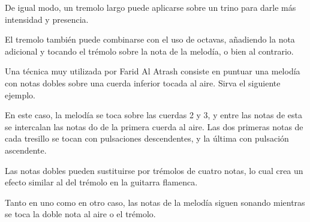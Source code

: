 De igual modo, un tremolo largo puede aplicarse sobre un trino para darle más intensidad y presencia.

El tremolo también puede combinarse con el uso de octavas, añadiendo la nota adicional y tocando el trémolo sobre la nota de la melodía, o bien al contrario.

Una técnica muy utilizada por Farid Al Atrash consiste en puntuar una melodía con notas dobles sobre una cuerda inferior tocada al aire. Sirva el siguiente ejemplo.


\begin{center}
\end{center}



En este caso, la melodía se toca sobre las cuerdas 2 y 3, y entre las notas de esta se intercalan las notas do de la primera cuerda al aire. Las dos primeras notas de cada tresillo se tocan con pulsaciones descendentes, y la última con pulsación ascendente.

Las notas dobles pueden sustituirse por trémolos de cuatro notas, lo cual crea un efecto similar al del trémolo en la guitarra flamenca.


\begin{center}
\end{center}



Tanto en uno como en otro caso, las notas de la melodía siguen sonando mientras se toca la doble nota al aire o el trémolo.

